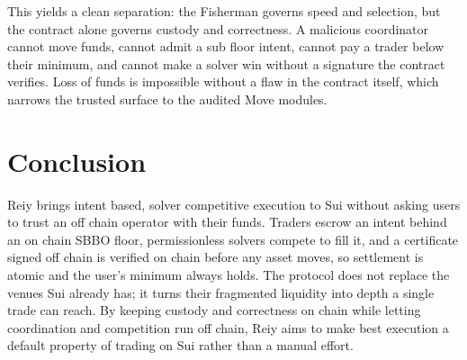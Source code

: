 \documentclass[10pt,sigconf,nonacm]{acmart}
\theoremstyle{reiythm}
\begin{document}
This yields a clean separation: the Fisherman governs speed and selection, but the
contract alone governs custody and correctness. A malicious coordinator cannot
move funds, cannot admit a sub floor intent, cannot pay a trader below their
minimum, and cannot make a solver win without a signature the contract verifies.
Loss of funds is impossible without a flaw in the contract itself, which narrows
the trusted surface to the audited Move modules.

\section{Conclusion}

Reiy brings intent based, solver competitive execution to Sui without asking users
to trust an off chain operator with their funds. Traders escrow an intent behind
an on chain SBBO floor, permissionless solvers compete to fill it, and a
certificate signed off chain is verified on chain before any asset moves, so
settlement is atomic and the user's minimum always holds. The protocol does not
replace the venues Sui already has; it turns their fragmented liquidity into depth
a single trade can reach. By keeping custody and correctness on chain while letting
coordination and competition run off chain, Reiy aims to make best execution a
default property of trading on Sui rather than a manual effort.




\end{document}
